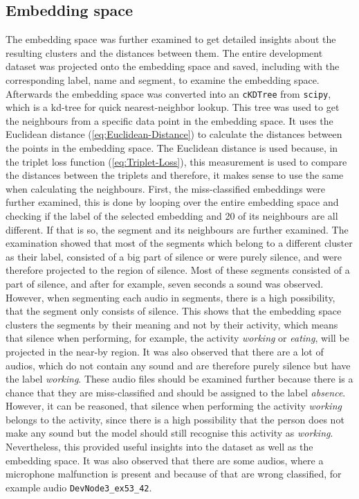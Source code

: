 \subsection{Embedding space}
\label{sub:Eval-Embedding-Space-DCASE}
The embedding space was further examined to get detailed insights about the resulting clusters and the distances between them.  The entire development dataset was projected onto the embedding space and saved, including with the corresponding label, name and segment, to examine the embedding space. Afterwards the embedding space was converted into an \texttt{cKDTree} from \texttt{scipy}, which is a kd-tree for quick nearest-neighbor lookup. This tree was used to get the neighbours from a specific data point in the embedding space. It uses the Euclidean distance (\ref{eq:Euclidean-Distance}) to calculate the distances between the points in the embedding space. The Euclidean distance is used because, in the triplet loss function (\ref{eq:Triplet-Loss}), this measurement is used to compare the distances between the triplets and therefore, it makes sense to use the same when calculating the neighbours.
\newline
\newline
First, the miss-classified embeddings were further examined, this is done by looping over the entire embedding space and checking if the label of the selected embedding and 20 of its neighbours are all different. If that is so, the segment and its neighbours are further examined. The examination showed that most of the segments which belong to a different cluster as their label, consisted of a big part of silence or were purely silence, and were therefore projected to the region of silence. Most of these segments consisted of a part of silence, and after for example, seven seconds a sound was observed. However, when segmenting each audio in segments, there is a high possibility, that the segment only consists of silence. This shows that the embedding space clusters the segments by their meaning and not by their activity, which means that silence when performing, for example, the activity \textit{working} or \textit{eating}, will be projected in the near-by region. It was also observed that there are a lot of audios, which do not contain any sound and are therefore purely silence but have the label \textit{working}. These audio files should be examined further because there is a chance that they are miss-classified and should be assigned to the label \textit{absence}. However, it can be reasoned, that silence when performing the activity \textit{working} belongs to the activity, since there is a high possibility that the person does not make any sound but the model should still recognise this activity as \textit{working}. Nevertheless, this provided useful insights into the dataset as well as the embedding space. It was also observed that there are some audios, where a microphone malfunction is present and because of that are wrong classified, for example audio \texttt{DevNode3\_ex53\_42}.
